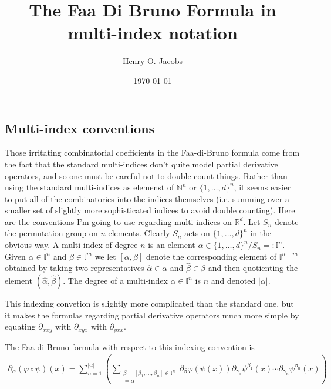 \documentclass[12pt]{amsart}
\title{The Faa Di Bruno Formula in multi-index notation}
\author{Henry O. Jacobs}
\date{\today}
\newcommand{\R}{\ensuremath{\mathbb{R}}}
\begin{document}
\maketitle

\subsection{Multi-index conventions}
Those irritating combinatorial coefficients in the Faa-di-Bruno formula
come from the fact that the standard multi-indices don't quite model
partial derivative operators, and so one must be careful not to double 
count things.
Rather than using the standard multi-indices as elemenst of $\mathbb{N}^n$ or
$\{1,\dots,d\}^n$,
it seems easier to put all of the combinatorics into the indices themselves (i.e. summing over a smaller set of slightly more sophisticated indices to avoid double counting).
Here are the conventions I'm going to use regarding multi-indices on $\R^d$.  Let $S_n$
  denote the permutation group on $n$ elements.
  Clearly $S_n$ acts on $\{ 1,\dots, d\}^n$ in the obvious way.
  A multi-index of degree $n$ is an element $\alpha \in \{1,\dots,d\}^n / S_n  =: \mathbb{I}^n$.
Given $\alpha \in \mathbb{I}^n$ and $\beta \in \mathbb{I}^m$ we let $[\alpha,\beta]$ denote the corresponding element of $\mathbb{I}^{n +m}$
obtained by taking two representatives $\hat{\alpha} \in \alpha$ and $\hat{\beta} \in \beta$ and then quotienting the element $(\hat{\alpha},\hat{\beta})$.
The degree of a multi-index $\alpha \in \mathbb{I}^n$ is $n$ and denoted $|\alpha|$.

This indexing convetion is slightly more complicated than the standard
one, but it makes the formulas regarding partial derivative operators much more simple by equating $\partial_{xxy}$ with $\partial_{xyx}$ with $\partial_{yxx}$.

The Faa-di-Bruno formula with respect to this indexing convention is
\begin{align*}
  \partial_\alpha( \varphi \circ \psi)(x) = \sum_{n=1}^{|\alpha|} \left(
  \sum_{ 
    \substack{
      \beta = [\beta_1,\dots,\beta_n] \in \mathbb{I}^n \\
      [\gamma_1,\dots,\gamma_n] = \alpha 
      }
    }
    \partial_\beta \varphi(\psi(x)) \partial_{\gamma_1} \psi^{\beta_1}(x) \cdots \partial_{\gamma_n} \psi^{\beta_n}(x)
  \right) 
\end{align*}
\end{document}
